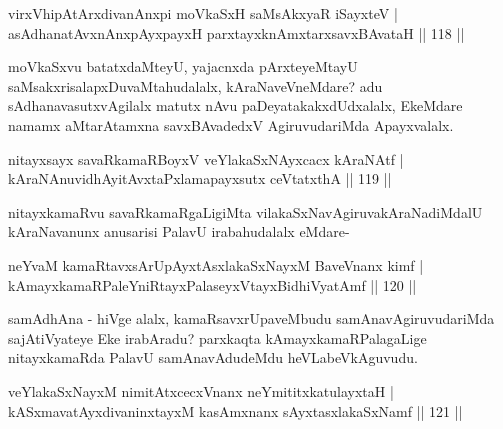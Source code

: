\begin{shl}
\footnotemark{}virxVhipAtArxdivanAnxpi moVkaSxH saMsAkxyaR iSayxteV |\\
asAdhanatAvxnAnxpAyxpayxH parxtayxknAmxtarxsavxBAvataH \hfill || 118 ||
\end{shl}

\begin{artha}
moVkaSxvu batatxdaMteyU, yajacnxda pArxteyeMtayU saMsakxrisalapxDuvaMtahudalalx, kAraNaveVneMdare? adu sAdhanavasutxvAgilalx matutx nAvu paDeyatakakxdUdxalalx, EkeMdare namamx aMtarAtamxna savxBAvadedxV AgiruvudariMda Apayxvalalx.
\end{artha}


\begin{shl}
nitayxsayx savaRkamaRBoyxV veYlakaSxNAyxcacx kAraNAtf |\\
kAraNAnuvidhAyitAvxtaPxlamapayxsutx ceVtatxthA \hfill || 119 ||
\end{shl}

\begin{artha}
nitayxkamaRvu savaRkamaRgaLigiMta vilakaSxNavAgiruvakAraNadiMdalU kAraNavanunx anusarisi PalavU irabahudalalx eMdare-
\end{artha}


\begin{shl}
neYvaM kamaRtavxsArUpAyxtAsxlakaSxNayxM BaveVnanx kimf |\\
kAmayxkamaRPaleYniRtayxPalaseyxVtayxBidhiVyatAmf \hfill || 120 ||
\end{shl}

\begin{artha}
samAdhAna - hiVge alalx, kamaRsavxrUpaveMbudu samAnavAgiruvudariMda sajAtiVyateye Eke irabAradu? parxkaqta kAmayxkamaRPalagaLige nitayxkamaRda PalavU samAnavAdudeMdu heVLabeVkAguvudu.
\end{artha}

\begin{shl}
veYlakaSxNayxM nimitAtxcecxVnanx neYmititxkatulayxtaH |\\
kASxmavatAyxdivaninxtayxM kasAmxnanx sAyxtasxlakaSxNamf \hfill || 121 ||
\end{shl}

